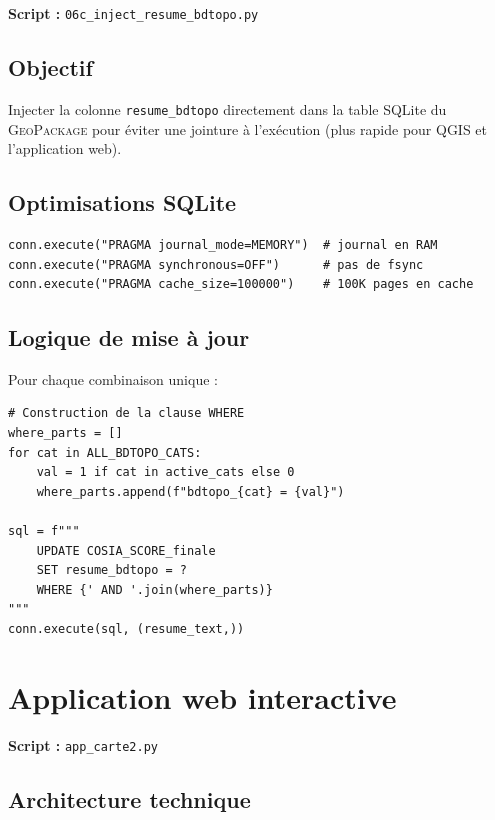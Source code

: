\documentclass[11pt,a4paper]{report}
\newcommand{\code}[1]{\texttt{\small #1}}
\newcommand{\gpkg}{\textsc{GeoPackage}}
\begin{document}
\textbf{Script :} \code{06c\_inject\_resume\_bdtopo.py}

\subsection{Objectif}

Injecter la colonne \code{resume\_bdtopo} directement dans la table SQLite du \gpkg{} pour éviter une jointure à l'exécution (plus rapide pour QGIS et l'application web).

\subsection{Optimisations SQLite}

\begin{lstlisting}[language=Python3, caption={Pragmas SQLite pour writes rapides}]
conn.execute("PRAGMA journal_mode=MEMORY")  # journal en RAM
conn.execute("PRAGMA synchronous=OFF")      # pas de fsync
conn.execute("PRAGMA cache_size=100000")    # 100K pages en cache
\end{lstlisting}

\subsection{Logique de mise à jour}

Pour chaque combinaison unique :
\begin{lstlisting}[language=Python3, caption={UPDATE ciblé par combo BD TOPO}]
# Construction de la clause WHERE
where_parts = []
for cat in ALL_BDTOPO_CATS:
    val = 1 if cat in active_cats else 0
    where_parts.append(f"bdtopo_{cat} = {val}")

sql = f"""
    UPDATE COSIA_SCORE_finale
    SET resume_bdtopo = ?
    WHERE {' AND '.join(where_parts)}
"""
conn.execute(sql, (resume_text,))
\end{lstlisting}

\section{Application web interactive}

\textbf{Script :} \code{app\_carte2.py}

\subsection{Architecture technique}
\end{document}
